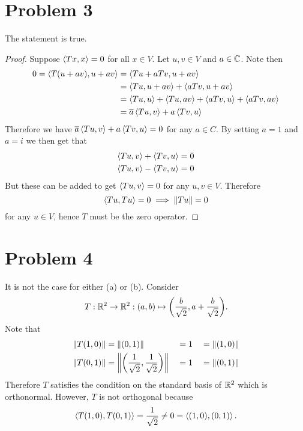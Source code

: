 \documentclass{article}
\begin{document}
\section*{Problem 3}
The statement is true.
\begin{proof}
    Suppose $\iprd{Tx, x} = 0$ for all $x \in V$. Let $u,v \in V$ and $a \in \mathbb{C}$. Note then
    \begin{align*}
        0 = \iprd{T(u + av), u + av} &= \iprd{Tu + aTv, u + av} \\
                                 &= \iprd{Tu, u + av} + \iprd{aTv, u + av} \\
                                 &= \iprd{Tu, u} + \iprd{Tu, av} + \iprd{aTv, u} + \iprd{aTv, av} \\
                                 &= \conj{a}\iprd{Tu, v} + a\iprd{Tv, u}
    \end{align*}
    Therefore we have $\conj{a} \iprd{Tu,v} + a \iprd{Tv, u} = 0$ for any $a \in C$. By setting $a = 1$ and $a = i$ we then get that
    \begin{align*}
        \iprd{T u, v } + \iprd{T v, u} &= 0 \\
        \iprd{T u, v } - \iprd{T v, u} &= 0
    \end{align*}
    But these can be added to get $\iprd{Tu, v} = 0$ for any $u,v \in V$. Therefore
    \[
        \iprd{Tu, Tu} = 0 \implies \norm{Tu} = 0
    \]
    for any $u \in V$, hence $T$ must be the zero operator.
\end{proof}

\section*{Problem 4}
It is not the case for either (a) or (b). Consider
\[
    T : \mathbb{R}^2 \to \mathbb{R}^2 : (a,b) \mapsto \qty(\frac{b}{\sqrt{2}}, a + \frac{b}{\sqrt{2}})
.\]
Note that
\begin{alignat*}{3}
    \norm{T (1, 0)} &= \norm{\qty(0, 1)} &&= 1 &&= \norm{(1,0)} \\
    \norm{T (0, 1)} &= \norm{\qty(\frac{1}{\sqrt{2}}, \frac{1}{\sqrt{2}})} &&= 1 &&= \norm{(0,1)}
\end{alignat*}
Therefore $T$ satisfies the condition on the standard basis of $\mathbb{R}^2$ which is orthonormal. However, $T$ is not orthogonal because
\[
    \iprd{T(1,0), T(0,1)} = \frac{1}{\sqrt{2}} \neq 0 = \iprd{(1,0), (0,1)}
.\]
\end{document}
